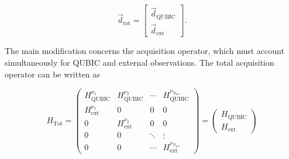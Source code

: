\documentclass[../../thesis.tex]{subfiles}
\begin{document}
\begin{equation}
        \vec{d}_{\mathrm{tot}}=
        \begin{bmatrix}
            \vec{d}_{\mathrm{QUBIC}} \\
            \vec{d}_{\mathrm{ext}}
    \end{bmatrix}.
\end{equation}

The main modification concerns the acquisition operator, which must account simultaneously for QUBIC and external observations. The total acquisition operator can be written as

\begin{equation}
    H_\text{Tot} = \begin{pmatrix}
        H_{\text{QUBIC}}^{\nu_1} & H_{\text{QUBIC}}^{\nu_2} & \cdots & H_{\text{QUBIC}}^{\nu_{N_\text{rec}}} \\
        H_{\text{ext}}^{\nu_1} & 0 & 0 & 0 \\
        0 & H_{\text{ext}}^{\nu_2} & 0 & 0 \\
        0 & 0 & \ddots & \vdots \\
        0 & 0 & \cdots & H_{\text{ext}}^{\nu_{N_\text{rec}}} 
        \end{pmatrix}
        = \begin{pmatrix}
            H_{\text{QUBIC}} \\
            H_{\text{ext}}
        \end{pmatrix}
        \label{eq:H_ext}
\end{equation}
\end{document}
